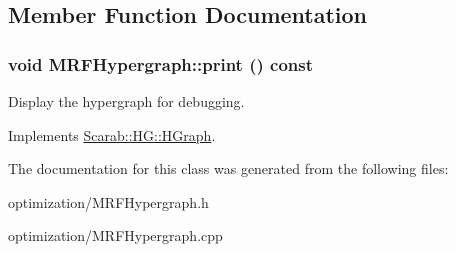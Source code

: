 \subsection{Member Function Documentation}
\hypertarget{class_m_r_f_hypergraph_aaac6b68c3ece41ddd1f8107e961879bc}{
\subsubsection[{print}]{\setlength{\rightskip}{0pt plus 5cm}void MRFHypergraph::print () const}}
\label{class_m_r_f_hypergraph_aaac6b68c3ece41ddd1f8107e961879bc}
Display the hypergraph for debugging. 

Implements \hyperlink{class_scarab_1_1_h_g_1_1_h_graph_ab5aa11c932b28864b56f28e0babbc1c1}{Scarab::HG::HGraph}.



The documentation for this class was generated from the following files:\begin{DoxyCompactItemize}
\item 
optimization/MRFHypergraph.h\item 
optimization/MRFHypergraph.cpp\end{DoxyCompactItemize}
